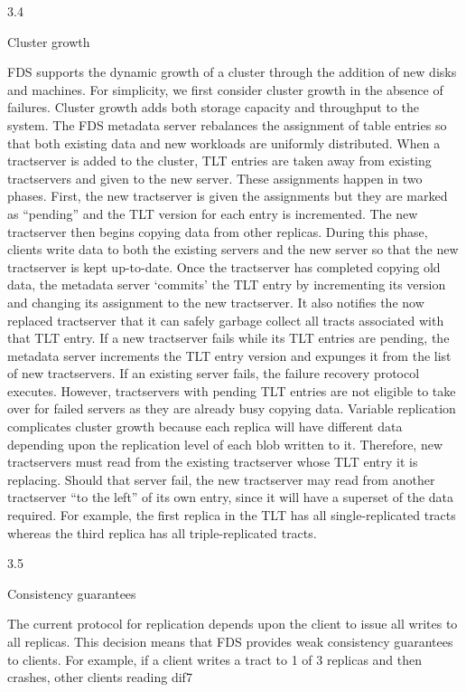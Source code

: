 3.4

Cluster growth

FDS supports the dynamic growth of a cluster through
the addition of new disks and machines. For simplicity,
we first consider cluster growth in the absence of failures.
Cluster growth adds both storage capacity and
throughput to the system. The FDS metadata server rebalances the assignment of table entries so that both existing data and new workloads are uniformly distributed.
When a tractserver is added to the cluster, TLT entries are
taken away from existing tractservers and given to the
new server. These assignments happen in two phases.
First, the new tractserver is given the assignments but
they are marked as “pending” and the TLT version for
each entry is incremented. The new tractserver then begins copying data from other replicas. During this phase,
clients write data to both the existing servers and the new
server so that the new tractserver is kept up-to-date. Once
the tractserver has completed copying old data, the metadata server ‘commits’ the TLT entry by incrementing its
version and changing its assignment to the new tractserver. It also notifies the now replaced tractserver that it
can safely garbage collect all tracts associated with that
TLT entry.
If a new tractserver fails while its TLT entries are
pending, the metadata server increments the TLT entry
version and expunges it from the list of new tractservers.
If an existing server fails, the failure recovery protocol
executes. However, tractservers with pending TLT entries are not eligible to take over for failed servers as they
are already busy copying data.
Variable replication complicates cluster growth because each replica will have different data depending
upon the replication level of each blob written to it.
Therefore, new tractservers must read from the existing
tractserver whose TLT entry it is replacing. Should that
server fail, the new tractserver may read from another
tractserver “to the left” of its own entry, since it will have
a superset of the data required. For example, the first
replica in the TLT has all single-replicated tracts whereas
the third replica has all triple-replicated tracts.

3.5

Consistency guarantees

The current protocol for replication depends upon the
client to issue all writes to all replicas. This decision
means that FDS provides weak consistency guarantees
to clients. For example, if a client writes a tract to 1
of 3 replicas and then crashes, other clients reading dif7

